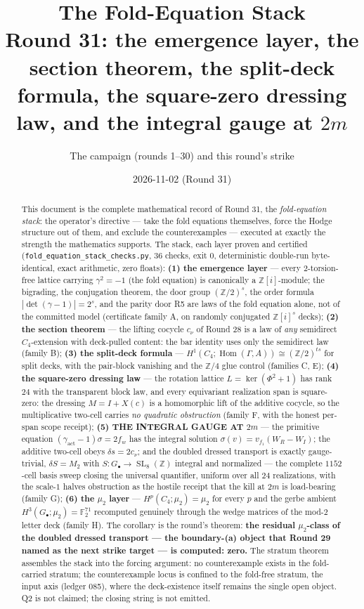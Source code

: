 \documentclass[11pt]{article}
\title{The Fold-Equation Stack\\
\large Round 31: the emergence layer, the section theorem, the split-deck
formula, the square-zero dressing law, and the integral gauge at $2m$}
\author{The campaign (rounds 1--30) and this round's strike}
\date{2026-11-02 (Round 31)}
\newcommand{\Z}{\mathbb Z}
\newcommand{\F}{\mathbb F}
\newcommand{\Hom}{\operatorname{Hom}}
\newcommand{\SL}{\operatorname{SL}}
\begin{document}
\maketitle

\begin{abstract}
This document is the complete mathematical record of Round 31, the
\emph{fold-equation stack}: the operator's directive --- take the fold
equations themselves, force the Hodge structure out of them, and exclude
the counterexamples --- executed at exactly the strength the mathematics
supports. The stack, each layer proven and certified
(\texttt{fold\_equation\_stack\_checks.py}, 36 checks, exit 0,
deterministic double-run byte-identical, exact arithmetic, zero floats):
\textbf{(1) the emergence layer} --- every $2$-torsion-free lattice
carrying $\gamma^2=-1$ (the fold equation) is canonically a
$\Z[i]$-module; the bigrading, the conjugation theorem, the door group
$(\Z/2)^s$, the order formula $|\det(\gamma-1)|=2^s$, and the parity
door R5 are laws of the fold equation alone, not of the committed model
(certificate family A, on randomly conjugated $\Z[i]^s$ decks);
\textbf{(2) the section theorem} --- the lifting cocycle $c_\nu$ of
Round 28 is a law of \emph{any} semidirect $C_4$-extension with
deck-pulled content: the bar identity uses only the semidirect law
(family B); \textbf{(3) the split-deck formula} ---
$H^1(C_4;\Hom(\Gamma,A))\cong(\Z/2)^{ts}$ for split decks, with the
pair-block vanishing and the $\Z/4$ glue control (families C, E);
\textbf{(4) the square-zero dressing law} --- the rotation lattice
$L=\ker(\Phi^2+1)$ has rank $24$ with the transparent block law, and
every equivariant realization span is square-zero: the dressing
$M=I+X(c)$ is a homomorphic lift of the additive cocycle, so the
multiplicative two-cell carries \emph{no quadratic obstruction}
(family F, with the honest per-span scope receipt); \textbf{(5) THE
INTEGRAL GAUGE AT $2m$} --- the primitive equation
$(\gamma_{\mathrm{act}}-1)\sigma=2f_w$ has the integral solution
$\sigma(v)=v_{f_1}(W_R-W_I)$; the additive two-cell obeys
$\delta s=2c_\nu$; and the doubled dressed transport is exactly
gauge-trivial, $\delta S=M_2$ with
$S\colon G_\bullet\to\SL_8(\Z)$ integral and normalized --- the
complete $1152$-cell basis sweep closing the universal quantifier,
uniform over all $24$ realizations, with the scale-$1$ halves
obstruction as the hostile receipt that the kill at $2m$ is
load-bearing (family G); \textbf{(6) the $\mu_2$ layer} ---
$H^p(C_4;\mu_2)=\mu_2$ for every $p$ and the gerbe ambient
$H^3(G_\bullet;\mu_2)=\F_2^{71}$ recomputed genuinely through the
wedge matrices of the mod-$2$ letter deck (family H). The corollary is
the round's theorem: \textbf{the residual $\mu_2$-class of the doubled
dressed transport --- the boundary-(a) object that Round 29 named as
the next strike target --- is computed: zero.} The stratum theorem
assembles the stack into the forcing argument: no counterexample
exists in the fold-carried stratum; the counterexample locus is
confined to the fold-free stratum, the input axis (ledger 085), where
the deck-existence itself remains the single open object. Q2 is not
claimed; the closing string is not emitted.
\end{abstract}
\end{document}
